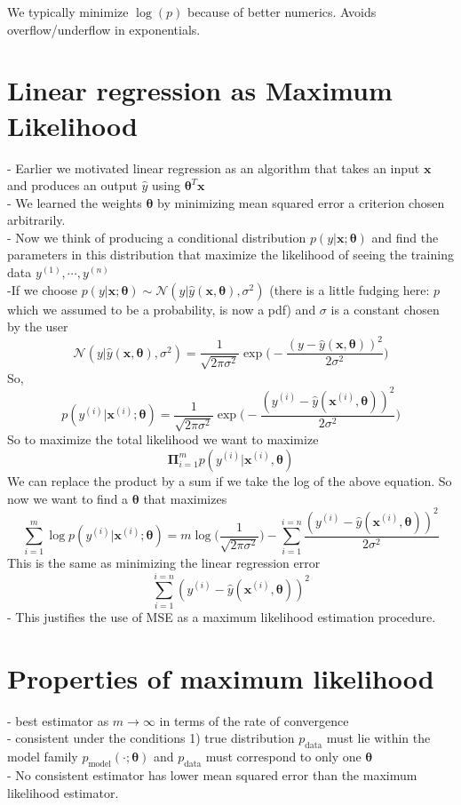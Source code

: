 \documentclass{article}
\newcommand{\beq}{\begin{equation}}
\newcommand{\eeq}{\end{equation}}
\begin{document}
We typically minimize $\log{(p)}$ because of better numerics. Avoids overflow/underflow in exponentials.

\section{Linear regression as Maximum Likelihood}
- Earlier we motivated linear regression as an algorithm that takes an input $\pmb{x}$ and produces an output $\hat{y}$ using ${\pmb{\theta}}^T\pmb{x}$\\
- We learned the weights $\pmb{\theta}$ by minimizing mean squared error a criterion chosen arbitrarily.\\
- Now we think of producing a conditional distribution $p(y|\pmb{x};\pmb{\theta})$ and find the parameters in this distribution that maximize the likelihood of seeing the training data $y^{(1)},\cdots,y^{(n)}$\\
-If we choose $p(y|\pmb{x};\pmb{\theta}) \sim \mathcal{N}(y|\hat{y}(\pmb{x},\pmb{\theta}),\sigma^2)$ (there is a little fudging here: $p$ which we assumed to be a probability, is now a pdf) and $\sigma$ is a constant chosen by the user\\
\beq
\mathcal{N}(y|\hat{y}(\pmb{x},\pmb{\theta}),\sigma^2) = \frac{1}{\sqrt{2\pi\sigma^2}}\exp\Big(-\frac{(y-\hat{y}(\pmb{x},\pmb{\theta}))^2}{2\sigma^2}\Big) 
\eeq
So,
\beq
p(y^{(i)}|\pmb{x}^{(i)};\pmb{\theta}) = \frac{1}{\sqrt{2\pi\sigma^2}}\exp\Big(-\frac{(y^{(i)}-\hat{y}(\pmb{x}^{(i)},\pmb{\theta}))^2}{2\sigma^2}\Big) 
\eeq
So to maximize the total likelihood we want to maximize
\beq
\pmb{\Pi}_{i=1}^{m}p(y^{(i)}|\pmb{x}^{(i)},\pmb{\theta})
\eeq
We can replace the product by a sum if we take the log of the above equation. So now we want to find a $\pmb{\theta}$ that maximizes
\beq
\sum_{i=1}^{m}\log{}p(y^{(i)}|\pmb{x}^{(i)};\pmb{\theta}) = m\log\Big(\frac{1}{\sqrt{2\pi\sigma^2}}\Big) - \sum_{i=1}^{i=n}\frac{(y^{(i)}-\hat{y}(\pmb{x}^{(i)},\pmb{\theta}))^2}{2\sigma^2}
\eeq
This is the same as minimizing the linear regression error
\beq
\sum_{i=1}^{i=n}(y^{(i)}-\hat{y}(\pmb{x}^{(i)},\pmb{\theta}))^2
\eeq
- This justifies the use of MSE as a maximum likelihood estimation procedure.
\section{Properties of maximum likelihood}
- best estimator as $m\rightarrow\infty$ in terms of the rate of convergence\\
- consistent under the conditions 1) true distribution $p_{\text{data}}$ must lie within the model family $p_{\text{model}}(\cdot;\pmb{\theta})$ and $p_{\text{data}}$ must correspond to only one $\pmb{\theta}$\\
- No consistent estimator has lower mean squared error than the maximum likelihood estimator.
\end{document}

